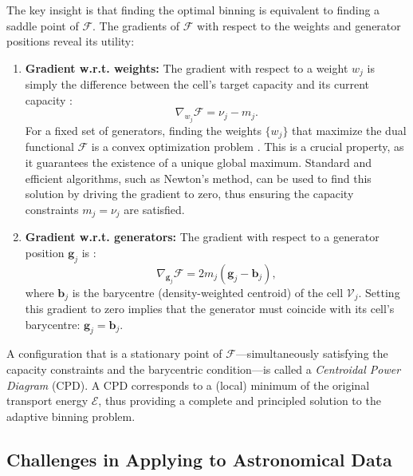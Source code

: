 \documentclass[fleqn,usenatbib]{mnras}
\begin{document}
The key insight is that finding the optimal binning is equivalent to finding a saddle point of $\mathcal{F}$. The gradients of $\mathcal{F}$ with respect to the weights and generator positions reveal its utility:
\begin{enumerate}
    \item \textbf{Gradient w.r.t. weights:} The gradient with respect to a weight $w_j$ is simply the difference between the cell's target capacity and its current capacity \citep{Aurenhammer1998,DeGoes2012}:
    \begin{equation}
        \nabla_{w_j} \mathcal{F} = \nu_j - m_j.
    \end{equation}
    For a fixed set of generators, finding the weights $\{w_j\}$ that maximize the dual functional $\mathcal{F}$ is a convex optimization problem \citep{Aurenhammer1998}. This is a crucial property, as it guarantees the existence of a unique global maximum. Standard and efficient algorithms, such as Newton's method, can be used to find this solution by driving the gradient to zero, thus ensuring the capacity constraints $m_j = \nu_j$ are satisfied.

    \item \textbf{Gradient w.r.t. generators:} The gradient with respect to a generator position $\mathbf{g}_j$ is \citep{DeGoes2012}:
    \begin{equation}
        \nabla_{\mathbf{g}_j} \mathcal{F} = 2 m_j (\mathbf{g}_j - \mathbf{b}_j),
    \end{equation}
    where $\mathbf{b}_j$ is the barycentre (density-weighted centroid) of the cell $\mathcal{V}_j$. Setting this gradient to zero implies that the generator must coincide with its cell's barycentre: $\mathbf{g}_j = \mathbf{b}_j$.
\end{enumerate}
A configuration that is a stationary point of $\mathcal{F}$---simultaneously satisfying the capacity constraints and the barycentric condition---is called a \emph{Centroidal Power Diagram} (CPD). A CPD corresponds to a (local) minimum of the original transport energy $\mathcal{E}$, thus providing a complete and principled solution to the adaptive binning problem.

\subsection{Challenges in Applying to Astronomical Data}
\end{document}
